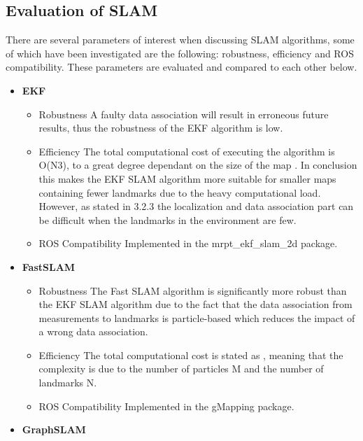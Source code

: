 \subsection{Evaluation of SLAM}
There are several parameters of interest when discussing SLAM algorithms, some of which have been investigated are the following: robustness, efficiency and ROS compatibility. These parameters are evaluated and compared to each other below.

\begin{itemize}
    \item \textbf{EKF}
        \begin{itemize}
            \item Robustness
                A faulty data association will result in erroneous future results, thus the robustness of the EKF algorithm is low. \cite{thrun2005}
            \item Efficiency
                The total computational cost of executing the algorithm is O(N3), to a great degree dependant on the size of the map \cite{bozao2010}. In conclusion this makes the EKF SLAM algorithm more suitable for smaller maps containing fewer landmarks due to the heavy computational load.\cite{cyrill2012} However, as stated in 3.2.3 the localization and data association part can be difficult when the landmarks in the environment are few. \cite{thrun2005}
            \item ROS Compatibility
                Implemented in the mrpt\_ekf\_slam\_2d package.
        \end{itemize}    
    \item \textbf{FastSLAM}
        \begin{itemize}
            \item Robustness
                The Fast SLAM algorithm is significantly more robust than the EKF SLAM algorithm due to the fact that the data association from measurements to landmarks is particle-based which reduces the impact of a wrong data association.
            \item Efficiency
                The total computational cost is stated as , meaning that the complexity is due to the number of particles M and the number of landmarks N. \cite{michael2007}
            \item ROS Compatibility
                Implemented in the gMapping package.
        \end{itemize}  
    \item \textbf{GraphSLAM}
        \begin{itemize}

\end{itemize}
\end{itemize}
